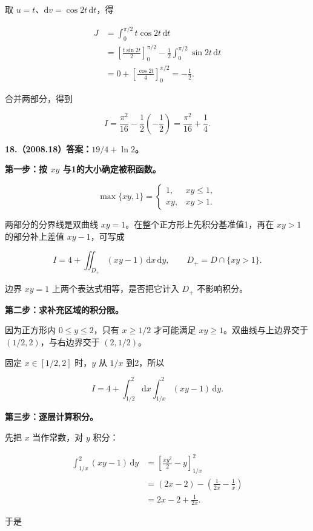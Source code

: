 \documentclass[UTF8,11pt,fontset=windows]{ctexart}
\begin{document}
取 $u=t$、$\mathrm dv=\cos2t\,\mathrm dt$，得

$$
\begin{aligned}
J&=\int_0^{\pi/2}t\cos2t\,\mathrm dt\\
&=\left[\frac{t\sin2t}{2}\right]_0^{\pi/2}
-\frac12\int_0^{\pi/2}\sin2t\,\mathrm dt\\
&=0+\left[\frac{\cos2t}{4}\right]_0^{\pi/2}
=-\frac12.
\end{aligned}
$$

合并两部分，得到

$$
\boxed{I=\frac{\pi^2}{16}-\frac12\left(-\frac12\right)
=\frac{\pi^2}{16}+\frac14}.
$$

\clearpage

\textbf{18.（2008.18）答案：$19/4+\ln2$。}

\textbf{第一步：按 $xy$ 与1的大小确定被积函数。}

$$
\max\{xy,1\}=\begin{cases}
1,&xy\le1,\\
xy,&xy>1.
\end{cases}
$$

两部分的分界线是双曲线 $xy=1$。在整个正方形上先积分基准值1，再在 $xy>1$ 的部分补上差值 $xy-1$，可写成

$$
I=4+\iint_{D_+}(xy-1)\,\mathrm dx\,\mathrm dy,
\qquad D_+=D\cap\{xy>1\}.
$$

边界 $xy=1$ 上两个表达式相等，是否把它计入 $D_+$ 不影响积分。

\textbf{第二步：求补充区域的积分限。}

因为正方形内 $0\le y\le2$，只有 $x\ge1/2$ 才可能满足 $xy\ge1$。双曲线与上边界交于 $(1/2,2)$，与右边界交于 $(2,1/2)$。

固定 $x\in[1/2,2]$ 时，$y$ 从 $1/x$ 到2，所以

$$
I=4+\int_{1/2}^2\mathrm dx\int_{1/x}^2(xy-1)\,\mathrm dy.
$$

\textbf{第三步：逐层计算积分。}

先把 $x$ 当作常数，对 $y$ 积分：

$$
\begin{aligned}
\int_{1/x}^2(xy-1)\,\mathrm dy
&=\left[\frac{xy^2}{2}-y\right]_{1/x}^2\\
&=(2x-2)-\left(\frac1{2x}-\frac1x\right)\\
&=2x-2+\frac1{2x}.
\end{aligned}
$$

于是
\end{document}
